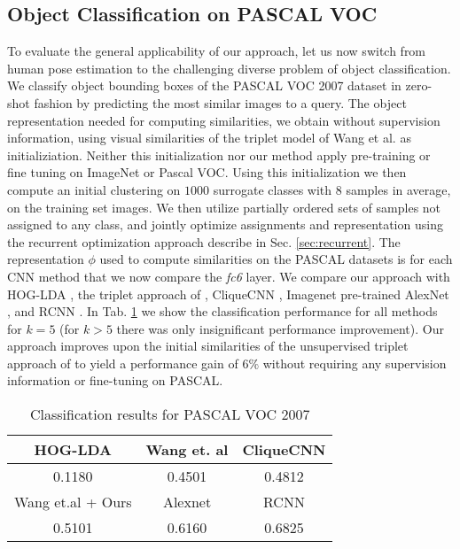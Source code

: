 \documentclass[10pt,twocolumn,letterpaper]{article}
\begin{document}
\subsection{Object Classification on PASCAL VOC}
To evaluate the general applicability of our approach, let us now switch from human pose estimation to the challenging diverse problem of object classification.
%
We classify object bounding boxes of the PASCAL VOC 2007 \cite{voc} dataset in zero-shot fashion by predicting the most similar images to a query. The object representation needed for computing similarities, we obtain without supervision information, using visual similarities of the triplet model of Wang et al. \cite{ConvNetpretext2} as initializiation. Neither this initialization nor our method apply pre-training or fine tuning on ImageNet or Pascal VOC. Using this initialization we then compute an initial clustering on  $1000$ surrogate classes with $8$ samples in average, on the training set images. We then utilize partially ordered sets of samples not assigned to any class, and jointly optimize assignments and representation using the recurrent optimization approach describe in Sec. \ref{sec:recurrent}. The representation $\phi$ used to compute similarities on the PASCAL datasets is for each CNN method that we now compare the \emph{fc6} layer.
We compare our approach with HOG-LDA \cite{hoglda}, the triplet approach of \cite{ConvNetpretext2}, CliqueCNN \cite{cliquecnn}, Imagenet pre-trained AlexNet \cite{alexnet}, and RCNN \cite{rcnn}. In Tab. \ref{tab:results_voc} we show the classification performance for all methods for $k=5$ (for $k>5$ there was only insignificant performance improvement). Our approach improves upon the initial similarities of the unsupervised triplet approach of \cite{ConvNetpretext2} to yield a performance gain of $6\%$ without requiring any supervision information or fine-tuning on PASCAL.

\begin{table}[!h]
    \scriptsize
    \centering
    \begin{tabular}{|c |c| c|}
    \hline
    HOG-LDA & Wang et. al \cite{ConvNetpretext2} & CliqueCNN\cite{cliquecnn}\\  
    \hline
    0.1180 &  0.4501 & 0.4812 \\
    \hline\hline
    Wang et.al \cite{ConvNetpretext2} + Ours & Alexnet \cite{alexnet} & RCNN \cite{rcnn}\\
    \hline
    0.5101 &0.6160 & 0.6825 \\
    \hline
    \end{tabular}
    \caption{Classification results for PASCAL VOC 2007}
    \label{tab:results_voc}
\end{table}
\end{document}
